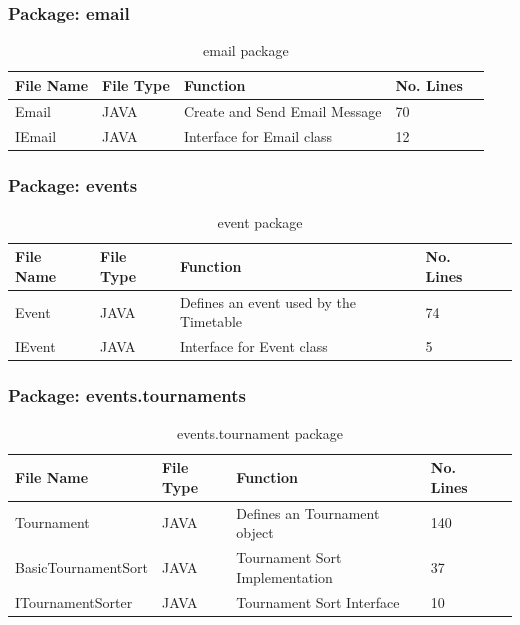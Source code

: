 \subsubsection{Package: email}
\begin{table}[H]
\begin{center}
     \begin{tabular}{| l | l | l| l |p{1cm} |}
    \hline
    File Name & File Type & Function & No. Lines\\ \hline
    Email & JAVA & Create and Send Email Message & 70\\ \hline
	IEmail & JAVA & Interface for Email class & 12\\ \hline	
    \end{tabular}
\end{center}
\caption{email package}
\end{table}

\subsubsection{Package: events}
\begin{table}[H]
\begin{center}
      \begin{tabular}{| l | l | l| l |p{1cm} |}
    \hline
    File Name & File Type & Function & No. Lines\\ \hline
    Event & JAVA & Defines an event used by the Timetable & 74\\ \hline
	IEvent & JAVA & Interface for Event class & 5\\ \hline	
    \end{tabular}
\end{center}
\caption{event package}
\end{table}

\subsubsection{Package: events.tournaments}
\begin{table}[H]
\begin{center}
     \begin{tabular}{| l | l | l| l |p{1cm} |}
    \hline
    File Name & File Type & Function & No. Lines\\ \hline
    Tournament & JAVA & Defines an Tournament object & 140\\ \hline
	BasicTournamentSort & JAVA & Tournament Sort Implementation & 37\\ \hline
	ITournamentSorter & JAVA & Tournament Sort Interface & 10\\ \hline
    \end{tabular}
\end{center}
\caption{events.tournament package}
\end{table}

